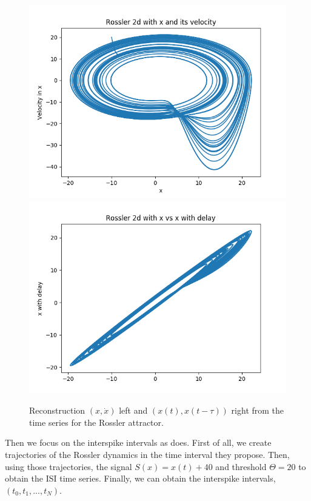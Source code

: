 \documentclass[10pt]{article}
\begin{document}
\begin{figure}[h!]
\centering
\includegraphics[scale=0.45]{rossler_x_xprima.png}
\includegraphics[scale=0.45]{rossler_x_xdelay.png}
\label{fig:rossler_x_xprima}
\caption{Reconstruction $(x,\dot x)$ left and $\left(x(t),x(t-\tau)\right)$ right from the time series for the Rossler attractor.}
\end{figure}

Then we focus on the interspike intervals as \cite{interspike} does. First of all, we create trajectories of the Rossler dynamics in the time interval they propose. Then, using those trajectories, the signal $S(x)=x(t)+40$ and threshold $\Theta=20$ to obtain the ISI time series. Finally, we can obtain the interspike intervals, $(t_0,t_1,...,t_N)$.
\end{document}
